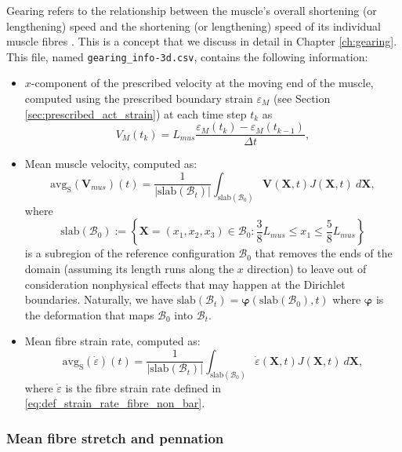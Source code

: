 \documentclass{sfuthesis}
\numberwithin{equation}{section}
\numberwithin{figure}{chapter}
\numberwithin{table}{chapter}
\theoremstyle{definition}
\def\*#1{{\mathbf{#1}}} %
\newcommand{\B}{\mathcal{B}}
\begin{document}
Gearing refers to the relationship between the muscle's overall shortening (or lengthening) speed and the shortening (or lengthening) speed of its individual muscle fibres \cite{Azizi2008VariableGearing,Eng2018}. This is a concept that we discuss in detail in Chapter \ref{ch:gearing}. This file, named \texttt{gearing\_info-3d.csv}, contains the following information:
\begin{itemize}
    \item $x$-component of the prescribed velocity at the moving end of the muscle, computed using the prescribed boundary strain $\varepsilon_M$ (see Section \ref{sec:prescribed_act_strain}) at each time step $t_k$ as
    \begin{equation}
        V_M(t_k) = L_{mus} \dfrac{\varepsilon_M(t_k) - \varepsilon_M(t_{k-1})}{\Delta t},
    \end{equation}
    \item Mean muscle velocity, computed as:
    \begin{equation}
        \mathrm{avg}_\mathrm{S}(\*V_{mus})(t) = \dfrac{1}{|\mathrm{slab}(\B_t)|} \int_{\mathrm{slab}(\B_0)} \*V(\*X,t) J(\*X,t) \ d\*X,
    \end{equation}
    where
    \begin{equation}
        \mathrm{slab}(\B_0) := \left\{ \*X = (x_1,x_2,x_3) \in \B_0 : \dfrac{3}{8}L_{mus} \leq x_1 \leq \dfrac{5}{8} L_{mus} \right\}
    \end{equation}
    is a subregion of the reference configuration $\B_0$ that removes the ends of the domain (assuming its length runs along the $x$ direction) to leave out of consideration nonphysical effects that may happen at the Dirichlet boundaries. Naturally, we have $\mathrm{slab}(\B_t) = \bm{\varphi} \left(\mathrm{slab}(\B_0), t \right)$ where $\bm{\varphi}$ is the deformation that maps $\B_0$ into $\B_t$.
    \item Mean fibre strain rate, computed as:
    \begin{equation} \label{eq:def_mean_fibre_strain_rate}
        \mathrm{avg}_\mathrm{S}(\dot{\varepsilon})(t) = \dfrac{1}{|\mathrm{slab}(\B_t)|} \int_{\mathrm{slab}(\B_0)} \dot{\varepsilon}(\*X,t) J(\*X,t) \ d\*X,
    \end{equation}
    where $\dot{\varepsilon}$ is the fibre strain rate defined in \eqref{eq:def_strain_rate_fibre_non_bar}. 
\end{itemize}

\subsubsection{Mean fibre stretch and pennation}
\end{document}
